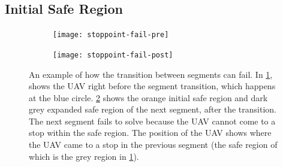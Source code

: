 \subsection{Initial Safe Region}
\label{subsec:safe-ext}
\begin{figure}
	\centering
	\begin{subfigure}[t]{0.35\columnwidth}
        		\texttt{[image: stoppoint-fail-pre]}
        		\caption{}
        		\label{fig:stoppoint-fail-pre}
	\end{subfigure}
	\hfill
	\begin{subfigure}[t]{0.35\columnwidth}
        		\texttt{[image: stoppoint-fail-post]}
        		\caption{}
        		 \label{fig:stoppoint-fail-post}
	\end{subfigure}		
	\caption[A case in which a lack of stop point makes a segment transition fail]{An example of how the transition between segments can fail. In \ref{fig:stoppoint-fail-pre}, shows the UAV right before the segment transition, which happens at the blue circle. \ref{fig:stoppoint-fail-post} shows the orange initial safe region and dark grey expanded safe region of the next segment, after the transition. The next segment fails to solve because the UAV cannot come to a stop within the safe region. The position of the UAV shows where the UAV came to a stop in the previous segment (the safe region of which is the grey region in \ref{fig:stoppoint-fail-pre}).}
    \label{fig:stoppoint-fail}     
\end{figure}

